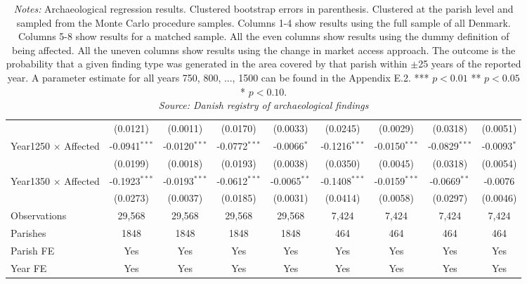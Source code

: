 \documentclass[11pt]{article}
\begin{document}
\begin{landscape}
\begin{table}
\begin{tabular}{lcccccccc}
                                                    & (0.0121)        & (0.0011)        & (0.0170)              & (0.0033)               & (0.0245)               & (0.0029)               & (0.0318)        & (0.0051)\\   
   Year1250 $\times$ Affected                       & -0.0941$^{***}$ & -0.0120$^{***}$ & -0.0772$^{***}$       & -0.0066$^{*}$          & -0.1216$^{***}$        & -0.0150$^{***}$        & -0.0829$^{***}$ & -0.0093$^{*}$\\   
                                                    & (0.0199)        & (0.0018)        & (0.0193)              & (0.0038)               & (0.0350)               & (0.0045)               & (0.0318)        & (0.0054)\\   
   Year1350 $\times$ Affected                       & -0.1923$^{***}$ & -0.0193$^{***}$ & -0.0612$^{***}$       & -0.0065$^{**}$         & -0.1408$^{***}$        & -0.0159$^{***}$        & -0.0669$^{**}$  & -0.0076\\   
                                                    & (0.0273)        & (0.0037)        & (0.0185)              & (0.0031)               & (0.0414)               & (0.0058)               & (0.0297)        & (0.0046)\\   
   \midrule
   Observations                                     & 29,568          & 29,568          & 29,568                & 29,568                 & 7,424                  & 7,424                  & 7,424          & 7,424\\  
   Parishes                                         & 1848            & 1848            & 1848                  & 1848                   & 464                    & 464                    & 464            & 464\\
   \midrule 
   Parish FE                                        & Yes             & Yes             & Yes                   & Yes                    & Yes                    & Yes                    & Yes            & Yes\\  
   Year FE                                          & Yes             & Yes             & Yes                   & Yes                    & Yes                    & Yes                    & Yes            & Yes\\
   \midrule \midrule
\end{tabular}
\parbox{1\textwidth}{
\caption*{\footnotesize \textit{Notes:} Archaeological regression results. Clustered bootstrap errors in parenthesis. Clustered at the parish level and sampled from the Monte Carlo procedure samples. Columns 1-4 show results using the full sample of all Denmark. Columns 5-8 show results for a matched sample. All the even columns show results using the dummy definition of being affected. All the uneven columns show results using the change in market access approach. The outcome is the probability that a given finding type was generated in the area covered by that parish within $\pm$25 years of the reported year. A parameter estimate for all years 750, 800, ..., 1500 can be found in the Appendix E.2. *** $p< 0.01$ ** $p< 0.05$ * $p< 0.10$. \\ \textit{Source: Danish registry of archaeological findings}}
}
\end{table}
\end{landscape}
\end{document}
